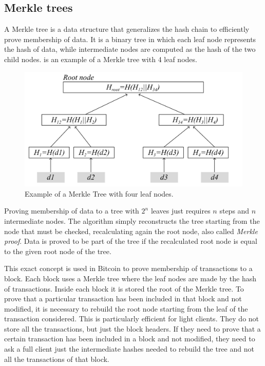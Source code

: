\subsection{Merkle trees}

A Merkle tree is a data structure that generalizes the hash chain to efficiently prove membership of data. It is a binary tree in which each leaf node represents the hash of data, while intermediate nodes are computed as the hash of the two child nodes.  is an example of a Merkle tree with 4 leaf nodes.

\begin{figure}[H]
  \centering
  \includegraphics[width=1\textwidth]{Figures/background/merkle_tree.jpg}
  \caption[]{Example of a Merkle Tree with four leaf nodes.}
  \label{fig:merkle-tree}
\end{figure}

Proving membership of data to a tree with $2^n$ leaves just requires $n$ steps and $n$ intermediate nodes. The algorithm simply reconstructs the tree starting from the node that must be checked, recalculating again the root node, also called \textit{Merkle proof}. Data is proved to be part of the tree if the recalculated root node is equal to the given root node of the tree.

This exact concept is used in Bitcoin to prove membership of transactions to a block. Each block uses a Merkle tree where the leaf nodes are made by the hash of transactions. Inside each block it is stored the root of the Merkle tree. To prove that a particular transaction has been included in that block and not modified, it is necessary to rebuild the root node starting from the leaf of the transaction considered. This is particularly efficient for light clients. They do not store all the transactions, but just the block headers. If they need to prove that a certain transaction has been included in a block and not modified, they need to ask a full client just the intermediate hashes needed to rebuild the tree and not all the transactions of that block.

